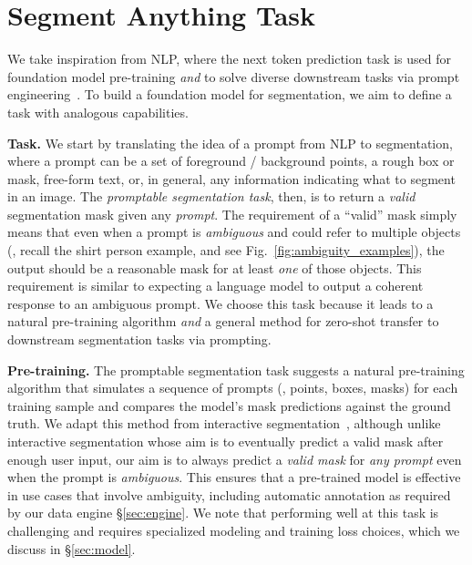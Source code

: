 \documentclass[10pt,twocolumn,letterpaper]{article}
\renewcommand{\paragraph}[1]{\vspace{1.25mm}\noindent\textbf{#1}}
\newcommand{\fig}[1]{Fig.~\ref{#1}}
\begin{document}
\section{Segment Anything Task}\label{sec:task}

We take inspiration from NLP, where the next token prediction task is used for foundation model pre-training \emph{and} to solve diverse downstream tasks via prompt engineering~\cite{Brown2020}. To build a foundation model for segmentation, we aim to define a task with analogous capabilities.

\paragraph{Task.} We start by translating the idea of a prompt from NLP to segmentation, where a prompt can be a set of foreground / background points, a rough box or mask, free-form text, or, in general, any information indicating what to segment in an image. The \emph{promptable segmentation task}, then, is to return a \emph{valid} segmentation mask given any \emph{prompt}. The requirement of a ``valid'' mask simply means that even when a prompt is \emph{ambiguous} and could refer to multiple objects (\eg, recall the shirt \vs person example, and see \fig{fig:ambiguity_examples}), the output should be a reasonable mask for at least \emph{one} of those objects. This requirement is similar to expecting a language model to output a coherent response to an ambiguous prompt. We choose this task because it leads to a natural pre-training algorithm \emph{and} a general method for zero-shot transfer to downstream segmentation tasks via prompting.

\paragraph{Pre-training.} The promptable segmentation task suggests a natural pre-training algorithm that simulates a sequence of prompts (\eg, points, boxes, masks) for each training sample and compares the model's mask predictions against the ground truth. We adapt this method from interactive segmentation~\cite{xu2016deep,mahadevan2018iteratively}, although unlike interactive segmentation whose aim is to eventually predict a valid mask after enough user input, our aim is to always predict a \emph{valid mask} for \emph{any prompt} even when the prompt is \emph{ambiguous}. This ensures that a pre-trained model is effective in use cases that involve ambiguity, including automatic annotation as required by our data engine \S\ref{sec:engine}. We note that performing well at this task is challenging and requires specialized modeling and training loss choices, which we discuss in \S\ref{sec:model}.
\end{document}
